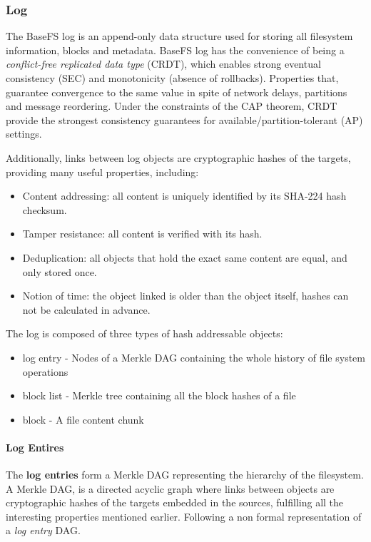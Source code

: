 \documentclass{sig-alternate}
\begin{document}
\subsubsection{Log}  \label{log}

The BaseFS log is an append-only data structure used for storing all filesystem information, blocks and metadata. BaseFS log has the convenience of being a \textit{conflict-free replicated data type} (CRDT), which enables strong eventual consistency (SEC) and monotonicity (absence of rollbacks). Properties that, guarantee convergence to the same value in spite of network delays, partitions and message reordering. Under the constraints of the CAP theorem, CRDT provide the strongest consistency guarantees for available/partition-tolerant (AP) settings\cite{Wikipedia:CRDT}.

Additionally, links between log objects are cryptographic hashes of the targets, providing many useful properties, including:

\begin{itemize}
\item Content addressing: all content is uniquely identified by its SHA-224 hash checksum.
\item Tamper resistance: all content is verified with its hash.
\item Deduplication: all objects that hold the exact same content are equal, and only stored once.
\item Notion of time: the object linked is older than the object itself, hashes can not be calculated in advance.
\end{itemize}

The log is composed of three types of hash addressable objects:

\begin{itemize}
    \item log entry - Nodes of a Merkle DAG containing the whole history of file system operations
    \item block list - Merkle tree containing all the block hashes of a file
    \item block - A file content chunk
\end{itemize}

\paragraph{Log Entires}
The \textbf{log entries} form a Merkle DAG representing the hierarchy of the filesystem. A Merkle DAG, is a directed acyclic graph where links between objects are cryptographic hashes of the targets embedded in the sources, fulfilling all the interesting properties mentioned earlier. Following a non formal representation of a \textit{log entry} DAG.
\end{document}
